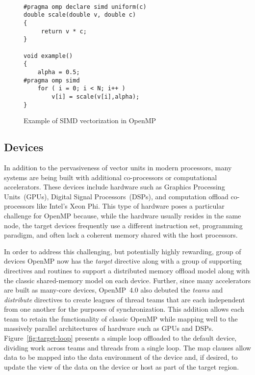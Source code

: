 \begin{figure}
\begin{verbatim}

#pragma omp declare simd uniform(c)
double scale(double v, double c)
{
     return v * c;
}

void example()
{
    alpha = 0.5;
#pragma omp simd 
    for ( i = 0; i < N; i++ )
        v[i] = scale(v[i],alpha);
}

\end{verbatim}
\caption{Example of SIMD vectorization in OpenMP}
\label{fig:simd-example}
\end{figure}

\subsection{Devices}
\label{sub:devices}

In addition to the pervasiveness of vector units in modern processors, many
systems are being built with additional co-processors or computational
accelerators.  These devices include hardware such as Graphics Processing
Units~(GPUs), Digital Signal Processors~(DSPs), and computation offload
co-processors like Intel's Xeon Phi.  This type of hardware poses a particular
challenge for OpenMP because, while the hardware usually resides in the same
node, the target devices frequently use a different instruction set, programming
paradigm, and often lack a coherent memory shared with the host processors.

In order to address this challenging, but potentially highly rewarding, group of
devices OpenMP now has the \emph{target} directive along with a group of
supporting directives and routines to support a distributed memory offload model
along with the classic shared-memory model on each device.  Further, since
many accelerators are built as many-core devices, OpenMP~4.0 also debuted the
\emph{teams} and \emph{distribute} directives to create leagues of thread teams
that are each independent from one another for the purposes of synchronization.
This addition allows each team to retain the functionality of classic OpenMP
while mapping well to the massively parallel architectures of hardware such as
GPUs and DSPs.  Figure~\ref{fig:target-loop} presents a simple loop offloaded to
the default device, dividing work across teams and threads from a single loop.
The map clauses allow data to be mapped into the data environment of the device
and, if desired, to update the view of the data on the device or host as part of
the target region.

